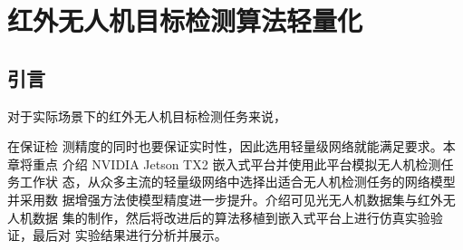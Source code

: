 
\chapter{红外无人机目标检测算法轻量化}

\section{引言}
对于实际场景下的红外无人机目标检测任务来说，

在保证检
测精度的同时也要保证实时性，因此选用轻量级网络就能满足要求。本章将重点
介绍 NVIDIA Jetson TX2 嵌入式平台并使用此平台模拟无人机检测任务工作状
态，从众多主流的轻量级网络中选择出适合无人机检测任务的网络模型并采用数
据增强方法使模型精度进一步提升。介绍可见光无人机数据集与红外无人机数据
集的制作，然后将改进后的算法移植到嵌入式平台上进行仿真实验验证，最后对
实验结果进行分析并展示。
